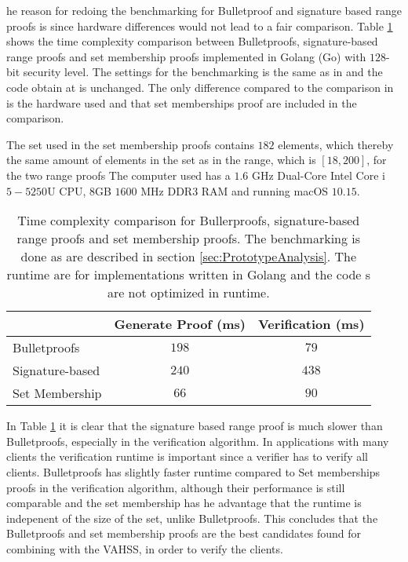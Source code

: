 he reason for redoing the benchmarking for Bulletproof and signature based range proofs is since hardware differences would not lead to a fair comparison. Table \ref{tab:runtime} shows the time complexity comparison between Bulletproofs, signature-based range proofs and set membership proofs implemented in Golang (Go) with $128$- bit security level.  The settings for the benchmarking is the same as in \cite{RANGE-SET}  and the code obtain at \cite{Git:RP} is unchanged. The only difference compared to the comparison in \cite{RANGE-SET} is the hardware used and that set memberships proof are included in the comparison. 

The set used in the set membership proofs contains $182$ elements, which thereby the same amount of elements in the set as in the range, which is $[18,200]$, for the two range proofs 
The computer used has a $1.6$ GHz Dual-Core Intel Core i$5-5250$U CPU, $8$GB $1600$ MHz DDR3 RAM  and running macOS $10.15$. 



\begin{table}
	\centering
	\caption{Time complexity comparison for Bullerproofs, signature-based range proofs and set membership proofs. The benchmarking is done as  are described in section \ref{sec:PrototypeAnalysis}. The runtime are for implementations written in Golang and the code s are not optimized in runtime. }
	\label{tab:runtime}
	\begin{tabular}[t]{ l c c }
			 \toprule
    									 		&Generate Proof (ms)	&		Verification  (ms)\\ \midrule		
  			Bulletproofs  				&   $ 198$   & $ 79$ 	\\
    			Signature-based 		&   $ 240 $   				&	$438$  \\
    			Set Membership 		&		$66$				&	$90$	\\
			\bottomrule		
	\end{tabular}
 \end{table}

 In Table \ref{tab:runtime} it is clear that the signature based range proof is much slower than Bulletproofs, especially  in the verification algorithm. In  applications with many clients the verification runtime  is important since a verifier has to verify all clients. Bulletproofs has slightly faster runtime compared to Set memberships proofs in the verification algorithm, although their performance is still comparable and the set membership has he advantage that the runtime is indepenent of the size of the set, unlike Bulletproofs. This concludes that the Bulletproofs and set membership proofs are the best candidates found for combining with the VAHSS, in order  to verify the clients.


